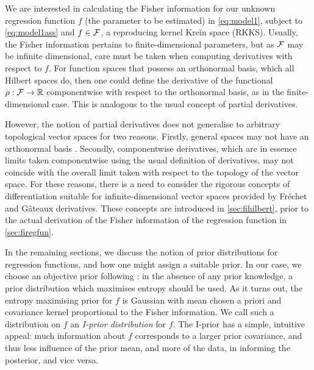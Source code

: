 \documentclass[11pt,twoside,openright]{report}
\begin{document}
\thispagestyle{chapterthree}

\newcommand{\funder}{\rho}  %

We are interested in calculating the Fisher information for our unknown regression function $f$ (the parameter to be estimated) in \cref{eq:model1}, subject to \cref{eq:model1ass} and $f\in{\mathcal F}$, a reproducing kernel Kreĭn space (RKKS).
Usually, the Fisher information pertains to finite-dimensional parameters, but as ${\mathcal F}$ may be infinite dimensional, care must be taken when computing derivatives with respect to $f$.
For function spaces that possess an orthonormal basis, which all Hilbert spaces do, then one could define the derivative of the functional $\funder:\cF\to\bbR$ componentwise with respect to the orthonormal basis, as in the finite-dimensional case.
This is analogous to the usual concept of partial derivatives.

However, the notion of partial derivatives does not generalise to arbitrary topological vector spaces for two reasons.
Firstly, general spaces may not have an orthonormal basis \citep[Sec. 5, p. 76]{tapia1971diff}.
Secondly, componentwise derivatives, which are in essence limits taken componentwise using the usual definition of derivatives, may not coincide with the overall limit taken with respect to the topology of the vector space.
For these reasons, there is a need to consider the rigorous concepts of differentiation suitable for infinite-dimensional vector spaces provided by Fréchet and Gâteaux derivatives.
These concepts are introduced in \cref{sec:fihilbert}, prior to the actual derivation of the Fisher information of the regression function in \cref{sec:firegfun}.

In the remaining sections, we discuss the notion of prior distributions for regression functions, and how one might assign a suitable prior.
In our case, we choose an objective prior following \citep{jaynes1957a,jaynes1957b,jaynes2003probability}: in the absence of any prior knowledge, a prior distribution which maximises entropy should be used.
As it turns out, the entropy maximising prior for $f$ is Gaussian with mean chosen a priori and covariance kernel proportional to the Fisher information.
We call such a distribution on $f$ an \emph{I-prior distribution} for $f$.
The I-prior has a simple, intuitive appeal: much information about $f$ corresponds to a larger prior covariance, and thus less influence of the prior mean, and more of the data, in informing the posterior, and vice versa.
\end{document}

